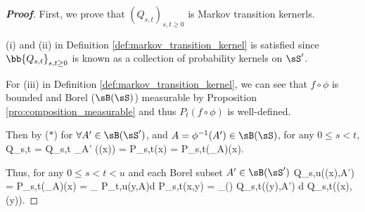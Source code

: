 \begin{proof}[\bf Proof]
First, we prove that $(Q_{s,t})_{s,t\geq 0}$ is Markov transition kernerls.

(i) and (ii) in Definition \ref{def:markov_transition_kernel} is satisfied since $\bb{Q_{s,t}}_{s,t\geq 0}$ is known as a collection of probability kernels on $\sS'$.


For (iii) in Definition \ref{def:markov_transition_kernel}, we can see that $f\circ \phi$ is bounded and Borel ($\sB(\sS)$) measurable by Proposition \ref{pro:composition_measurable} and thus $P_t(f\circ \phi)$ is well-defined. 

Then by ($*$) for $\forall A'\in \sB(\sS')$, and $A = \phi^{-1}(A')\in \sB(\sS)$, for any $0\leq s< t$,
\be
Q_{s,t} = Q_{s,t} \ind_{A'} (\phi(x)) = P_{s,t}(x) = P_{s,t}(\ind_A)(x).
\ee





Thus, for any $0\leq s<t<u$  and each Borel subset $A'\in \sB(\sS')$
\be
Q_{s,u}(\phi(x),A') = P_{s,t}(\ind_A)(x) = \int_{\sS} P_{t,u}(y,A)d P_{s,t}(x,y) = \int_{\phi(\sS)} Q_{s,t}(\phi(y),A') d Q_{s,t}(\phi(x),\phi(y)).  
\ee




\end{proof}
